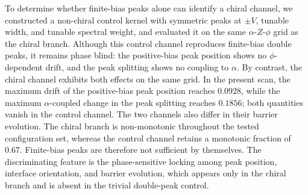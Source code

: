 
To determine whether finite-bias peaks alone can identify a chiral channel, we
constructed a non-chiral control kernel with symmetric peaks at $\pm V$,
tunable width, and tunable spectral weight, and evaluated it on the same
$\alpha$-$Z$-$\phi$ grid as the chiral branch. Although this control channel
reproduces finite-bias double peaks, it remains phase blind: the positive-bias
peak position shows no $\phi$-dependent drift, and the peak splitting shows no
coupling to $\alpha$. By contrast, the chiral channel exhibits both effects on
the same grid. In the present scan, the maximum drift of the positive-bias peak
position reaches $0.0928$, while the maximum $\alpha$-coupled change in the
peak splitting reaches $0.1856$; both quantities vanish in the control
channel. The two channels also differ in their barrier evolution. The chiral
branch is non-monotonic throughout the tested configuration set, whereas the
control channel retains a monotonic fraction of $0.67$. Finite-bias peaks are
therefore not sufficient by themselves. The discriminating feature is the
phase-sensitive locking among peak position, interface orientation, and barrier
evolution, which appears only in the chiral branch and is absent in the trivial
double-peak control.

\caption{\textbf{Control discriminant for chiral finite-bias peaks.}
Comparison between the chiral finite-bias edge-state kernel and a non-chiral
control kernel with symmetric peaks at $\pm V$, tunable width, and tunable
spectral weight, evaluated on the same $\alpha$-$Z$-$\phi$ grid. The control
channel generates finite-bias double peaks but remains phase blind: the
positive-bias peak position does not drift with $\phi$, and the peak splitting
does not couple to $\alpha$. By contrast, the chiral channel exhibits both
phase-locked peak-position drift and $\alpha$-coupled peak splitting. In the
present scan, the maximum positive-peak drift is $0.0928$ for the chiral
channel and $0$ for the control, while the maximum $\alpha$-coupled change in
peak splitting is $0.1856$ for the chiral channel and $0$ for the control. The
chiral branch is also non-monotonic over the full tested configuration set,
whereas the control channel retains a monotonic fraction of $0.67$. Finite-bias
peaks alone are therefore insufficient: the manuscript claim rests on the
phase-sensitive coupling among peak position, interface orientation, and
barrier evolution, which the trivial double-peak control fails to reproduce.}
